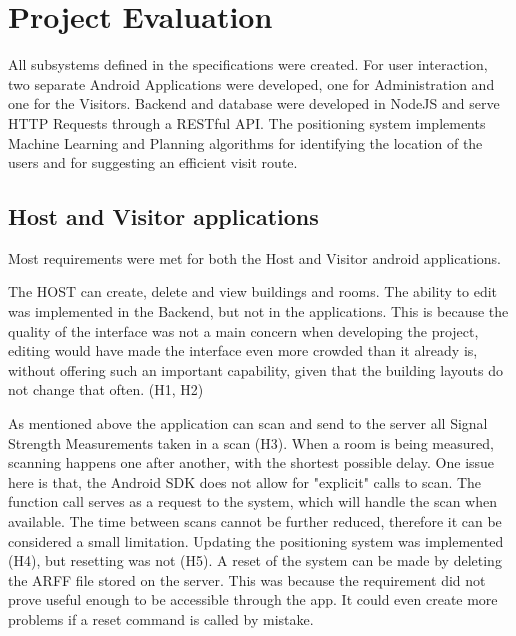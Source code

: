 \section{Project Evaluation}
All subsystems defined in the specifications were created. For user interaction, two separate Android Applications were developed, one for Administration and one for the Visitors. Backend and database were developed in NodeJS and serve HTTP Requests through a RESTful API. The positioning system implements Machine Learning and Planning algorithms for identifying the location of the users and for suggesting an efficient visit route.

\subsection{Host and Visitor applications}
Most requirements were met for both the Host and Visitor android applications. 

The HOST can create, delete and view buildings and rooms. The ability to edit was implemented in the Backend, but not in the applications. This is because the quality of the interface was not a main concern when developing the project, editing would have made the interface even more crowded than it already is, without offering such an important capability, given that the building layouts do not change that often. (H1, H2)

As mentioned above the application can scan and send to the server all Signal Strength Measurements taken in a scan (H3). When a room is being measured, scanning happens one after another, with the shortest possible delay. One issue here is that, the Android SDK does not allow for "explicit" calls to scan. The function call serves as a request to the system, which will handle the scan when available. The time between scans cannot be further reduced, therefore it can be considered a small limitation. Updating the positioning system was implemented (H4), but resetting was not (H5). A reset of the system can be made by deleting the ARFF file stored on the server. This was because the requirement did not prove useful enough to be accessible through the app. It could even create more problems if a reset command is called by mistake. 

